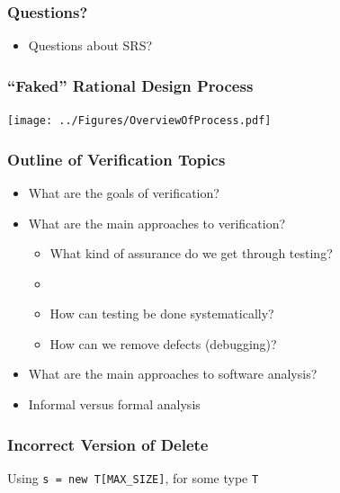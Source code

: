 \documentclass[t,12pt,numbers,fleqn]{beamer}
\begin{document}
\begin{frame}
\frametitle{Questions?}
\begin{itemize}
\item Questions about SRS?
\end{itemize}
\end{frame}

\begin{frame}
\frametitle{``Faked'' Rational Design Process}

\begin{center}
\texttt{[image: ../Figures/OverviewOfProcess.pdf]}
\end{center}


\end{frame}


\begin{frame}
\frametitle{Outline of Verification Topics}

\begin{itemize}

\item What are the goals of verification?
\item What are the main approaches to verification?
\begin{itemize}
\item What kind of assurance do we get through testing?  
\item {}
\item How can testing be done systematically?
\item How can we remove defects (debugging)?
\end{itemize}
\item What are the main approaches to software analysis?
\item Informal versus formal analysis

\end{itemize}

\end{frame}


\begin{frame}
\frametitle{Incorrect Version of Delete}

Using \texttt{s = new T[MAX\_SIZE]}, for some type \texttt{T}

\lstset{language=java,breaklines=true,showspaces=false,showstringspaces=false,breakatwhitespace=true}
\noindent 

\bi
\item {}
\item {}
\ei

\end{frame}
\end{document}
